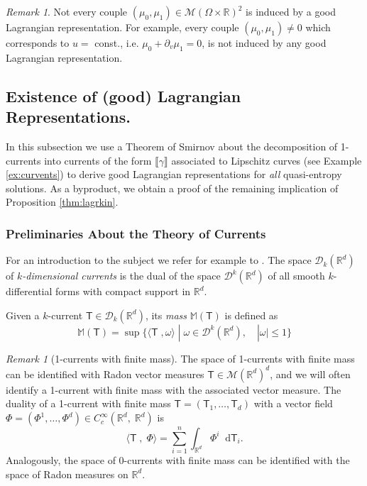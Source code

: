 \documentclass[11pt, twoside, reqno]{amsart}
\theoremstyle{definition}
\theoremstyle{remark}
\newtheorem{remark}[thm]{Remark}
\numberwithin{equation}{section}
\newcommand*\dif{\mathop{}\!\mathrm{d}}
\newcommand{\ms}[1]{\mathsf{#1}}
\begin{document}
\begin{remark}
    Not every couple $(\mu_0, \mu_1) \in \mathscr M(\Omega \times \mathbb R)^2$ is induced by a good Lagrangian representation. For example, every couple $(\mu_0, \mu_1) \neq 0 $  which corresponds to $u = $ const., i.e. $\mu_0 + \partial_v \mu_1 = 0$,  is not induced by any good Lagrangian representation.
\end{remark}


\subsection{Existence of (good) Lagrangian Representations.}
In this subsection we use a Theorem of Smirnov \cite{smirnov_currents}  about the decomposition of  1-currents into currents of the form $\llbracket\gamma\rrbracket$ associated to Lipschitz curves (see Example \ref{ex:curvents}) to derive good  Lagrangian representations for \textit{all} quasi-entropy solutions. As a byproduct, we obtain a proof of the remaining implication of Proposition \ref{thm:lagrkin}.

\subsubsection{Preliminaries About the Theory of Currents} For an introduction to the subject we refer for example to \cite{KP_book}.
The space $\mathscr D_k(\mathbb R^d)$ of \textit{$k$-dimensional currents} is the dual of the space $\mathscr D^k(\mathbb R^d)$ of all smooth $k$-differential forms with compact support in $\mathbb R^d$. 

Given a $k$-current $\ms T \in \mathscr D_k(\mathbb R^d)$, its \textit{mass} $\mathbb M(\ms T)$ is defined as 
$$
\mathbb M (\ms T) = \sup\{\langle \ms T \; , \omega\rangle \; | \; \omega \in \mathscr D^k(\mathbb R^d), \quad |\omega | \leq 1\}
$$
\begin{remark}[1-currents with finite mass]
The space of 1-currents with finite mass can be identified with Radon vector measures $\ms T \in \mathscr M(\mathbb R^d)^d$, and we will often identify a 1-current with finite mass with the associated vector measure. The duality of a 1-current  with finite mass $\ms T = (\ms T_1, \ldots, \ms T_d)$ with a vector field $\Phi = (\Phi^1, \ldots, \Phi^d)\in C^\infty_c(\mathbb R^d,\;  \mathbb R^d)$ is 
$$
\langle \ms T \; , \; \Phi\rangle =  \sum_{i=1}^n \int_{\mathbb R^d}\Phi^i \dif \ms T_i.
$$
Analogously, the space of $0$-currents with finite mass can be identified with the space of Radon measures on $\mathbb R^d$.
\end{remark}
\end{document}
